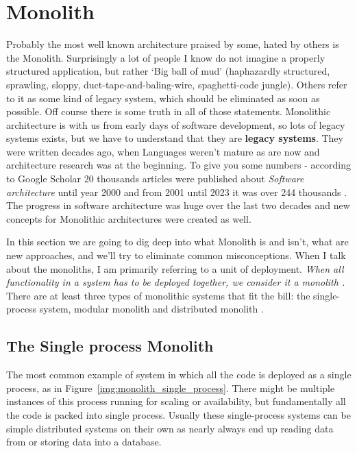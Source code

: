 
\section{Monolith}
Probably the most well known architecture praised by some, hated by others is the Monolith. Surprisingly a lot of people I know do not imagine a properly structured application, but rather `Big ball of mud' \cite{BIG_BALL_OF_MUD} (haphazardly structured, sprawling, sloppy, duct-tape-and-baling-wire, spaghetti-code jungle). Others refer to it as some kind of legacy system, which should be eliminated as soon as possible. Off course there is some truth in all of those statements. Monolithic architecture is with us from early days of software development, so lots of legacy systems exists, but we have to understand that they are \textbf{legacy systems}. They were written decades ago, when Languages weren't mature as are now and architecture research was at the beginning. To give you some numbers - according to Google Scholar 20 thousands articles were published about \textit{Software architecture} until year 2000 \cite{SCHOLAR_2000} and from 2001 until 2023 it was over 244 thousands \cite{SCHOLAR_2001_2023}. The progress in software architecture was huge over the last two decades and new concepts for Monolithic architectures were created as well.

In this section we are going to dig deep into what Monolith is and isn't, what are new approaches, and we'll try to eliminate common misconceptions. When I talk about the monoliths, I am primarily referring to a unit of deployment\cite{MON_TO_MS_MONOLITH}. \textit{When all functionality in a system has to be deployed together, we consider it a monolith \cite{MON_TO_MS_MONOLITH}.} There are at least three types of monolithic systems that fit the bill: the single-process system, modular monolith and distributed monolith \cite{BUILDING_MS_MONOLITH}.


\subsection{The Single process Monolith}
The most common example of system in which all the code is deployed as a single process, as in Figure~\ref{img:monolith_single_process}. There might be multiple instances of this process running for scaling or availability, but fundamentally all the code is packed into single process. Usually these single-process systems can be simple distributed systems on their own as nearly always end up reading data from or storing data into a database. \cite{MON_TO_MS_MONOLITH}

